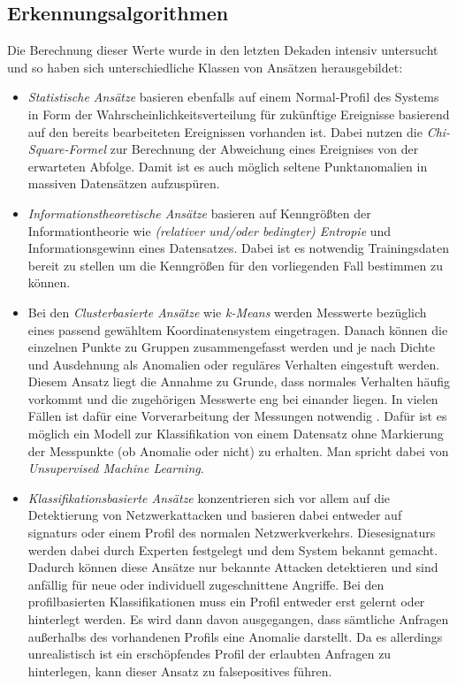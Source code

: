 \subsection{Erkennungsalgorithmen}
Die Berechnung dieser Werte wurde in den letzten Dekaden intensiv untersucht und so haben sich unterschiedliche Klassen von Ansätzen herausgebildet\cite{ahmed2016survey}:
\begin{itemize}
\item \textit{Statistische Ansätze} basieren ebenfalls auf einem Normal-Profil des Systems in Form der Wahrscheinlichkeitsverteilung für zukünftige Ereignisse basierend auf den bereits bearbeiteten  Ereignissen vorhanden ist. Dabei nutzen \citet{ye2001anomaly} die \textit{Chi-Square-Formel} zur Berechnung der Abweichung eines Ereignises von der erwarteten Abfolge. Damit ist es auch möglich seltene Punktanomalien in massiven Datensätzen aufzuspüren.
\item \textit{Informationstheoretische Ansätze} basieren auf Kenngrößten der Informationtheorie wie \textit{(relativer und/oder bedingter) Entropie} und Informationsgewinn eines Datensatzes. Dabei ist es notwendig Trainingsdaten bereit zu stellen um die Kenngrößen für den vorliegenden Fall bestimmen zu können. \cite{noble2003graph}
\item Bei den \textit{Clusterbasierte Ansätze} wie \textit{k-Means}\cite{likas2003global} werden Messwerte bezüglich eines passend gewähltem Koordinatensystem eingetragen. Danach können die einzelnen Punkte zu Gruppen zusammengefasst werden und je nach Dichte und Ausdehnung als Anomalien oder reguläres Verhalten eingestuft werden. Diesem Ansatz liegt die Annahme zu Grunde, dass normales Verhalten häufig vorkommt und die zugehörigen Messwerte eng bei einander liegen. In vielen Fällen ist dafür eine Vorverarbeitung der Messungen notwendig \cite{munz2007traffic}. Dafür ist es möglich ein Modell zur Klassifikation von einem Datensatz ohne Markierung der Messpunkte (ob Anomalie oder nicht) zu erhalten. Man spricht dabei von \textit{Unsupervised Machine Learning}\cite{munz2007traffic}.
\item \textit{Klassifikationsbasierte Ansätze} konzentrieren sich vor allem auf die Detektierung von Netzwerkattacken und basieren dabei entweder auf \Glspl{signatur} oder einem Profil des normalen Netzwerkverkehrs. Diese\Glspl{signatur} werden dabei durch Experten festgelegt und dem System bekannt gemacht. Dadurch können diese Ansätze nur bekannte Attacken detektieren und sind anfällig für neue oder individuell zugeschnittene Angriffe. Bei den profilbasierten Klassifikationen muss ein Profil entweder erst gelernt oder hinterlegt werden. Es wird dann davon ausgegangen, dass sämtliche Anfragen außerhalbs des vorhandenen Profils eine Anomalie darstellt. Da es allerdings unrealistisch ist ein erschöpfendes Profil der erlaubten Anfragen zu hinterlegen, kann dieser Ansatz zu \Glspl{falsepositive} führen. 
\end{itemize}
